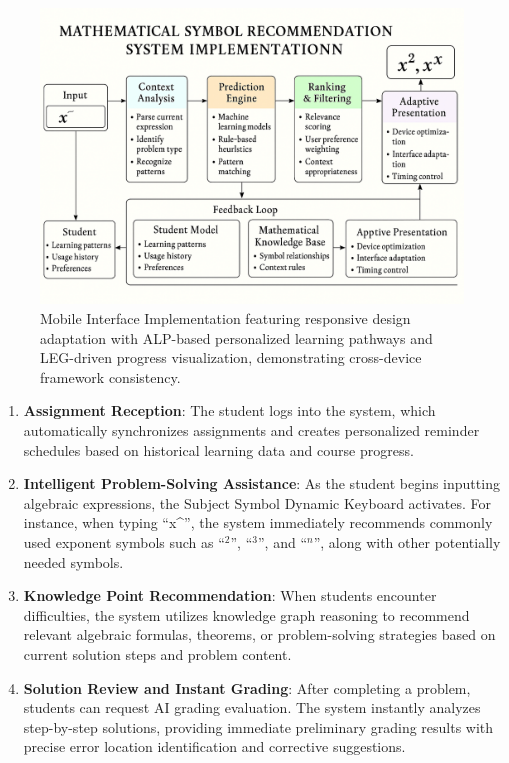 \documentclass[conference]{IEEEtran}
\begin{document}
\begin{IEEEkeywords}
\begin{figure}[htbp]
\centerline{\includegraphics[width=\columnwidth]{6.png}}
\caption{Mobile Interface Implementation featuring responsive design adaptation with ALP-based personalized learning pathways and LEG-driven progress visualization, demonstrating cross-device framework consistency.}
\label{fig:mobile_interface}
\end{figure}



\begin{enumerate}
\item \textbf{Assignment Reception}: The student logs into the system, which automatically synchronizes assignments and creates personalized reminder schedules based on historical learning data and course progress.

\item \textbf{Intelligent Problem-Solving Assistance}: As the student begins inputting algebraic expressions, the Subject Symbol Dynamic Keyboard activates. For instance, when typing ``x\^{}'', the system immediately recommends commonly used exponent symbols such as ``$^2$'', ``$^3$'', and ``$^n$'', along with other potentially needed symbols.

\item \textbf{Knowledge Point Recommendation}: When students encounter difficulties, the system utilizes knowledge graph reasoning to recommend relevant algebraic formulas, theorems, or problem-solving strategies based on current solution steps and problem content.

\item \textbf{Solution Review and Instant Grading}: After completing a problem, students can request AI grading evaluation. The system instantly analyzes step-by-step solutions, providing immediate preliminary grading results with precise error location identification and corrective suggestions.


\end{enumerate}
\end{IEEEkeywords}
\end{document}
